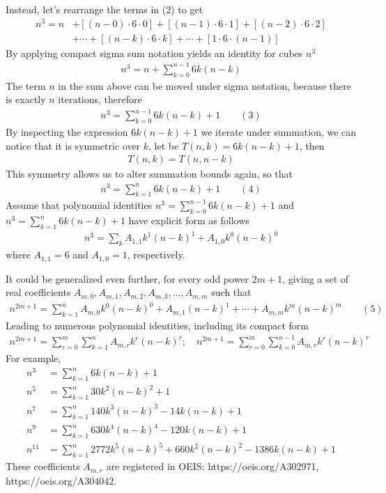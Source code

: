 Instead, let's rearrange the terms in (2) to get
\begin{align*}
    n^3 = n &+ [(n-0) \cdot 6 \cdot 0] + [(n-1)\cdot6\cdot1] + [(n-2)\cdot6\cdot2] \\
    &+ \cdots + [(n-k)\cdot 6 \cdot k] + \cdots + [1\cdot6\cdot(n-1)]
\end{align*}
By applying compact sigma sum notation yields an identity for cubes $n^3$
\begin{align*}
    n^3 = n + \sum_{k=0}^{n-1} 6k(n-k)
\end{align*}
The term $n$ in the sum above can be moved under sigma notation, because there is exactly $n$ iterations, therefore
\begin{align*}
    n^3 = \sum_{k=0}^{n-1} 6k(n-k) + 1 \quad \quad (3)
\end{align*}
By inspecting the expression $6k(n-k) + 1$ we iterate under summation,
we can notice that it is symmetric over $k$, let be $T(n,k) = 6k(n-k) + 1$, then
\begin{align*}
    T(n,k) = T(n,n-k)
\end{align*}
This symmetry allows us to alter summation bounds again, so that
\begin{align*}
    n^3 = \sum_{k=1}^{n} 6k(n-k) + 1 \quad \quad (4)
\end{align*}
Assume that polynomial identities
$n^3 = \sum_{k=0}^{n-1} 6k(n-k) + 1$ and $n^3 = \sum_{k=1}^{n} 6k(n-k) + 1$
have explicit form as follows
\begin{align*}
    n^3 = \sum_{k} A_{1,1} k^1(n-k)^1 + A_{1,0} k^0(n-k)^0
\end{align*}
where $A_{1,1} = 6$ and $A_{1,0} = 1$, respectively.

It could be generalized even further, for every odd power $2m+1$, giving a set of real coefficients
$A_{m,0}, A_{m,1},A_{m,2},A_{m,3}, \ldots, A_{m,m}$ such that
\begin{align*}
    n^{2m+1} = \sum_{k=1}^{n} A_{m,0} k^0 (n-k)^0 + A_{m,1} (n-k)^1
    + \cdots + A_{m,m} k^m (n-k)^m \quad \quad (5)
\end{align*}
Leading to numerous polynomial identities, including its compact form
\begin{align*}
    n^{2m+1} = \sum_{r=0}^{m} \sum_{k=1}^{n} A_{m,r} k^r (n-k)^r; \quad n^{2m+1} = \sum_{r=0}^{m} \sum_{k=0}^{n-1} A_{m,r} k^r (n-k)^r
\end{align*}
For example,
\begin{align*}
    n^3 &= \sum_{k=1}^{n} 6k(n-k) + 1 \\
    n^5 &= \sum_{k=1}^{n} 30k^2(n-k)^2 + 1 \\
    n^7 &= \sum_{k=1}^{n} 140 k^3 (n-k)^3 - 14k(n-k) + 1 \\
    n^9 &= \sum_{k=1}^{n} 630 k^4(n-k)^4 - 120k(n-k) + 1 \\
    n^{11} &= \sum_{k=1}^{n} 2772 k^5(n-k)^5 + 660 k^2(n-k)^2 - 1386k(n-k) + 1
\end{align*}
These coefficients $A_{m,r}$ are registered in OEIS: https://oeis.org/A302971, https://oeis.org/A304042.

